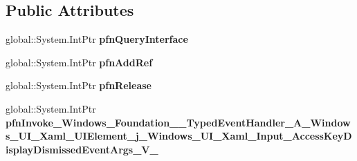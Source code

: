 \subsection*{Public Attributes}
\begin{DoxyCompactItemize}
\item 
\mbox{\label{struct_windows_1_1_foundation_1_1_typed_event_handler___a___windows___u_i___xaml___u_i_element__d3bbe6abc1f0f1df72766f3122d9fe94_aed1108a307c50146e817f2948b6f8c4e}} 
global\+::\+System.\+Int\+Ptr {\bfseries pfn\+Query\+Interface}
\item 
\mbox{\label{struct_windows_1_1_foundation_1_1_typed_event_handler___a___windows___u_i___xaml___u_i_element__d3bbe6abc1f0f1df72766f3122d9fe94_ab573bfe7882d7f68be68c569f5bfcc8a}} 
global\+::\+System.\+Int\+Ptr {\bfseries pfn\+Add\+Ref}
\item 
\mbox{\label{struct_windows_1_1_foundation_1_1_typed_event_handler___a___windows___u_i___xaml___u_i_element__d3bbe6abc1f0f1df72766f3122d9fe94_a1e1ad6a49bf942cc18749921b4dff41c}} 
global\+::\+System.\+Int\+Ptr {\bfseries pfn\+Release}
\item 
\mbox{\label{struct_windows_1_1_foundation_1_1_typed_event_handler___a___windows___u_i___xaml___u_i_element__d3bbe6abc1f0f1df72766f3122d9fe94_a3d83b79a61627d568218703116cfd0c2}} 
global\+::\+System.\+Int\+Ptr {\bfseries pfn\+Invoke\+\_\+\+Windows\+\_\+\+Foundation\+\_\+\+\_\+\+Typed\+Event\+Handler\+\_\+\+A\+\_\+\+Windows\+\_\+\+U\+I\+\_\+\+Xaml\+\_\+\+U\+I\+Element\+\_\+j\+\_\+\+Windows\+\_\+\+U\+I\+\_\+\+Xaml\+\_\+\+Input\+\_\+\+Access\+Key\+Display\+Dismissed\+Event\+Args\+\_\+\+V\+\_\+}
\end{DoxyCompactItemize}
